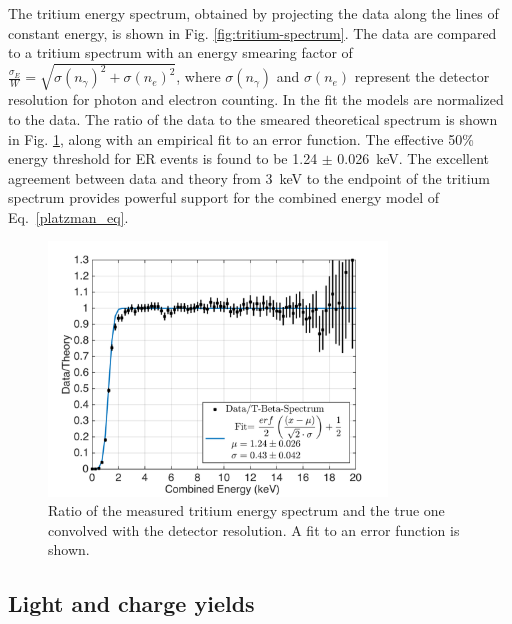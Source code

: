 The tritium energy spectrum, obtained by projecting the data along the lines of constant energy, is shown in Fig. \ref{fig:tritium-spectrum}. The data are compared to a tritium spectrum with an energy smearing factor of $ \frac{\sigma_E}{W} = \sqrt{\sigma(n_{\gamma})^2 + \sigma(n_e)^2}$, where $ \sigma(n_{\gamma})$ and $ \sigma(n_e)$ represent the detector resolution for photon and electron counting. In the fit the models are normalized to the data. The ratio of the data to the smeared theoretical spectrum is shown in Fig. \ref{fig:ER-threshold}, along with an empirical fit to an error function. The effective 50\% energy threshold for ER events is found to be 1.24 $\pm$ 0.026~keV. The excellent agreement between data and theory from 3~keV to the endpoint of the tritium spectrum provides powerful support for the combined energy model of Eq.~\ref{platzman_eq}.

\begin{figure}[h!]
\includegraphics[width=90mm]{fig/E_Thres_Fit.png}
\caption{Ratio of the measured tritium energy spectrum and the true one convolved with the detector resolution. A fit to an error function is shown.}
\label{fig:ER-threshold}
\end{figure}

\subsection{Light and charge yields}

